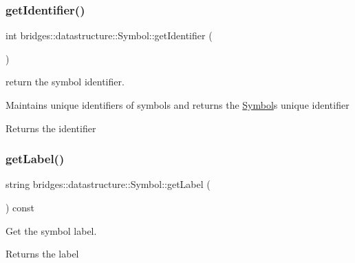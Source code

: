 \subsubsection{\texorpdfstring{get\+Identifier()}{getIdentifier()}}
{\footnotesize\ttfamily int bridges\+::datastructure\+::\+Symbol\+::get\+Identifier (\begin{DoxyParamCaption}{ }\end{DoxyParamCaption})\hspace{0.3cm}{\ttfamily [inline]}}



return the symbol identifier. 

Maintains unique identifiers of symbols and returns the \hyperlink{classbridges_1_1datastructure_1_1_symbol}{Symbol}\textquotesingle{}s unique identifier

\begin{DoxyReturn}{Returns}
the identifier 
\end{DoxyReturn}
\mbox{\label{classbridges_1_1datastructure_1_1_symbol_a549906b96da5d53b964844ca5f593b7f}} 
\subsubsection{\texorpdfstring{get\+Label()}{getLabel()}}
{\footnotesize\ttfamily string bridges\+::datastructure\+::\+Symbol\+::get\+Label (\begin{DoxyParamCaption}{ }\end{DoxyParamCaption}) const\hspace{0.3cm}{\ttfamily [inline]}}



Get the symbol label. 

\begin{DoxyReturn}{Returns}
the label 
\end{DoxyReturn}
\mbox{\label{classbridges_1_1datastructure_1_1_symbol_a6ab847b892f510e185f2aebb9302bc82}} 
